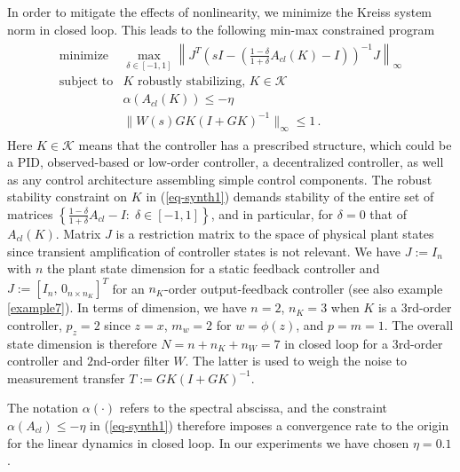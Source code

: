\documentclass[12pt, a4paper,reqno]{amsart}
\theoremstyle{definition}
\begin{document}
In order to
mitigate the effects of nonlinearity, we minimize the Kreiss system norm in closed loop. 
This leads to the following min-max constrained program
\begin{align}
\label{eq-synth1}
\begin{array}{ll}
\displaystyle\mbox{minimize} & \displaystyle\max_{\delta \in [-1,1]} \left\| J^T \left( sI- \left(\textstyle \frac{1-\delta}{1+\delta} A_{cl}(K)-I \right)\right)^{-1} J \right\|_\infty\\
\mbox{subject to}& K \mbox{ robustly stabilizing}, \, K \in \mathscr K \\
& \alpha(A_{cl}(K)) \leq -\eta \\
& \|W(s)GK(I+GK)^{-1}\|_\infty \leq  1 \,.
\end{array}
\end{align}
Here $K\in \mathscr K$ means that the controller has a prescribed structure,  which could be a PID, 
observed-based or low-order controller, a decentralized controller,
as well as any control architecture assembling simple control components. 
The robust stability constraint on $K$ in (\ref{eq-synth1})  demands stability of the entire set of matrices 
$\left\{\frac{1-\delta}{1+\delta} A_{cl}-I: \;\delta \in [-1,1]\right\}$,  and in particular, for $\delta=0$ that of
$A_{cl}(K)$. Matrix $J$ is a restriction matrix to the space of physical plant states since transient amplification of controller states is not relevant.  We have $J:=I_n$ with $n$ the plant state dimension for a static feedback controller and $J:= [I_n,\,0_{n\times n_K}]^T$ for an $n_K$-order  output-feedback controller (see also  example \ref{example7}). %
In terms of dimension, we have  $n=2$, $n_K = 3$ when $K$ is a  $3$rd-order controller, $p_z = 2$ since $z=x$, $m_w=2$ for $w = \phi(z)$, and $p=m=1$. The overall state dimension is therefore $N=n+n_K+n_W =7$ in closed loop for a $3$rd-order controller and $2$nd-order filter $W$. The latter is used to weigh the noise to measurement transfer $T:= GK(I+GK)^{-1}$. 

The notation $\alpha(\cdot)$ refers to the spectral abscissa, and 
the constraint $\alpha(A_{cl})\leq -\eta$ in (\ref{eq-synth1}) therefore
imposes a convergence rate to the origin for the linear dynamics in closed loop. In our experiments we have chosen $\eta = 0.1$.
\end{document}
